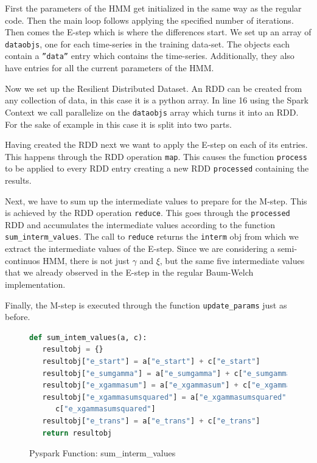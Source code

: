 First the parameters of the HMM get initialized in the same way as the regular code. Then the main loop follows applying the specified number of iterations. Then comes the E-step which is where the differences start. We set up an array of \texttt{dataobjs}, one for each time-series in the training data-set. The objects each contain a \texttt{''data''} entry which contains the time-series. Additionally, they also have entries for all the current parameters of the HMM. 

Now we set up the Resilient Distributed Dataset. An RDD can be created from any collection of data, in this case it is a python array. In line 16 using the Spark Context we call parallelize on the \texttt{dataobjs} array which turns it into an RDD. For the sake of example in this case it is split into two parts. 

Having created the RDD next we want to apply the E-step on each of its entries. This happens through the RDD operation \texttt{map}. This causes the function \texttt{process} to be applied to every RDD entry creating a new RDD \texttt{processed} containing the results. 

Next, we have to sum up the intermediate values to prepare for the M-step. This is achieved by the RDD operation \texttt{reduce}. This goes through the \texttt{processed} RDD and accumulates the intermediate values according to the function \texttt{sum\_interm\_values}. The call to \texttt{reduce} returns the \texttt{interm} obj from which we extract the intermediate values of the E-step. Since we are considering a semi-continuos HMM, there is not just $\gamma$ and $\xi$, but the same five intermediate values that we already observed in the E-step in the regular Baum-Welch implementation. 

Finally, the M-step is executed through the function \texttt{update\_params} just as before. 

\newpage

\begin{figure}
\begin{singlespace}
\begin{lstlisting}[language=Python]
def sum_intem_values(a, c):
   resultobj = {}
   resultobj["e_start"] = a["e_start"] + c["e_start"]
   resultobj["e_sumgamma"] = a["e_sumgamma"] + c["e_sumgamma"]
   resultobj["e_xgammasum"] = a["e_xgammasum"] + c["e_xgammasum"]
   resultobj["e_xgammasumsquared"] = a["e_xgammasumsquared"] + \
      c["e_xgammasumsquared"]
   resultobj["e_trans"] = a["e_trans"] + c["e_trans"]
   return resultobj
\end{lstlisting}
\end{singlespace}
\caption{Pyspark Function: sum\_interm\_values}    
\label{fig:pyspark-sum-listing}
\end{figure}

